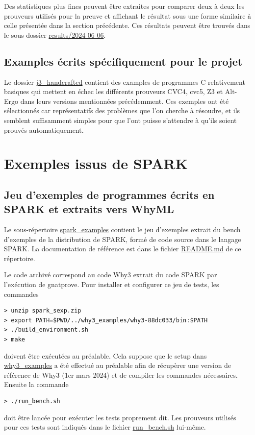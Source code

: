 \documentclass[a4paper,11pt]{article}
\begin{document}
Des statistiques plus fines peuvent être extraites pour comparer deux à deux
les prouveurs utilisés pour la preuve et affichant le résultat sous une forme
similaire à celle présentée dans la section précédente. Ces résultats peuvent
être trouvés dans le sous-dossier \url{results/2024-06-06}.

\subsection*{Examples écrits spécifiquement pour le projet}

Le dossier \url{j3_handcrafted} contient des examples de programmes C
relativement basiques qui mettent en échec les différents prouveurs CVC4, cvc5,
Z3 et Alt-Ergo dans leurs versions mentionnées précédemment.
Ces exemples ont été sélectionnés car représentatifs des problèmes que l'on
cherche à résoudre, et ils semblent suffisamment simples pour que l'ont puisse
s'attendre à qu'ils soient prouvés automatiquement.

\section{Exemples issus de SPARK}

\subsection{Jeu d'exemples de programmes écrits en SPARK et extraits vers WhyML}

Le sous-répertoire \url{spark_examples} contient le jeu d'exemples extrait du
bench d'exemples de la distribution de SPARK, formé de code source dans le
langage SPARK. La documentation de référence est dans le fichier
\url{README.md} de ce répertoire.

Le code archivé correspond au code Why3 extrait du code SPARK par l'exécution
de gnatprove. Pour installer et configurer ce jeu de tests, les commandes
\begin{lstlisting}
> unzip spark_sexp.zip
> export PATH=$PWD/../why3_examples/why3-88dc033/bin:$PATH
> ./build_environment.sh
> make
\end{lstlisting}
doivent être exécutées au préalable. Cela suppose que le setup dans \url{why3_examples}
a été effectué au préalable afin de récupèrer une version de
référence de Why3 (1er mars 2024) et de compiler les commandes nécessaires. Ensuite la commande
\begin{lstlisting}
> ./run_bench.sh
\end{lstlisting}
doit être lancée pour exécuter les tests proprement dit. Les prouveurs
utilisés pour ces tests sont indiqués dans le fichier
\url{run_bench.sh} lui-même.
\end{document}
